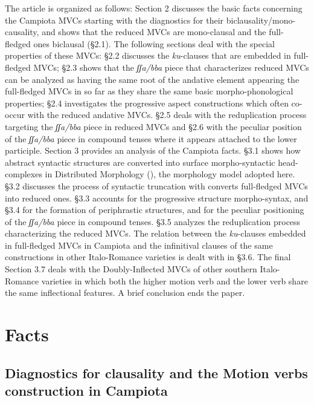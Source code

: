 \documentclass[output=paper]{langscibook}
\begin{document}
The article is organized as follows:  Section 2 discusses the basic facts concerning the Campiota MVCs starting with the diagnostics for their biclausality/mono-causality, and shows that the reduced MVCs are mono-clausal and the full-fledged ones biclausal (§2.1).  The following sections deal with the special properties of these MVCs:  §2.2 discusses the \textit{ku}-clauses that are embedded in full-fledged MVCs; §2.3 shows that the \textit{ʃʃa/bba} piece that characterizes reduced MVCs can be analyzed as having the same root of the andative element appearing  the full-fledged MVCs in so far as they share the same basic morpho-phonological properties; §2.4 investigates the progressive aspect constructions which often co-occur with the reduced andative MVCs. §2.5 deals with the reduplication process targeting the \textit{ʃʃa/bba} piece in reduced MVCs and §2.6 with the peculiar position of the \textit{ʃʃa/bba} piece in compound tenses where it appears attached to the lower participle.  Section 3 provides an analysis of the Campiota facts. §3.1 shows how abstract syntactic structures are converted into surface morpho-syntactic head-complexes in Distributed Morphology (\citealt{halle1993a}), the morphology model adopted here. §3.2 discusses the process of syntactic truncation with converts full-fledged MVCs into reduced ones. §3.3 accounts for the progressive structure morpho-syntax, and §3.4 for the formation of periphrastic structures, and for the peculiar positioning of the \textit{ʃʃa/bba} piece in compound tenses. §3.5 analyzes the reduplication process characterizing the reduced MVCs. The relation between the \textit{ku}-clauses embedded in full-fledged MVCs in Campiota and the infinitival clauses of the same constructions in other Italo-Romance varieties is dealt with in §3.6. The final Section 3.7 deals with the Doubly-Inflected MVCs of other southern Italo-Romance varieties in which both the higher motion verb and the lower verb share the same inflectional features. A brief conclusion ends the paper.

\section{Facts}
\subsection{Diagnostics for clausality and the Motion verbs construction in Campiota}
\end{document}
